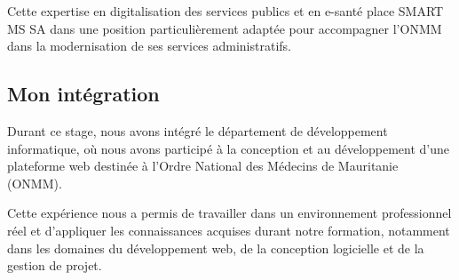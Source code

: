 ﻿\documentclass[12pt,a4paper]{report}
\begin{document}
\noindent
Cette expertise en digitalisation des services publics et en e-santé
place SMART MS SA dans une position particulièrement adaptée pour
accompagner l'ONMM dans la modernisation de ses services administratifs.


\subsection{Mon intégration}

Durant ce stage, nous avons intégré le département de développement
informatique, où nous avons participé à la conception et au
développement d’une plateforme web destinée à l’Ordre National des
Médecins de Mauritanie (ONMM).

Cette expérience nous a permis de travailler dans un environnement
professionnel réel et d’appliquer les connaissances acquises durant
notre formation, notamment dans les domaines du développement web, de la
conception logicielle et de la gestion de projet.





\end{document}
